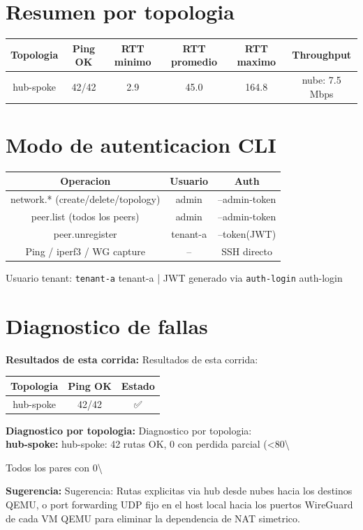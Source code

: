 \documentclass[11pt,a4paper]{article}
\begin{document}
\section{Resumen por topologia}
\begin{longtable}{|c|c|c|c|c|c|}
\hline
Topologia & Ping OK & RTT minimo & RTT promedio & RTT maximo & Throughput \\ \hline
hub-spoke & 42/42 & 2.9 & 45.0 & 164.8 & nube: 7.5 Mbps \\ \hline
\end{longtable}

\section{Modo de autenticacion CLI}
\begin{longtable}{|c|c|c|}
\hline
Operacion & Usuario & Auth \\ \hline
network.* (create/delete/topology) & admin & --admin-token \\ \hline
peer.list (todos los peers) & admin & --admin-token \\ \hline
peer.unregister & tenant-a & --token(JWT) \\ \hline
Ping / iperf3 / WG capture & -- & SSH directo \\ \hline
\end{longtable}

Usuario tenant:  \texttt{tenant-a} tenant-a  | JWT generado via  \texttt{auth-login} auth-login\\

\section{Diagnostico de fallas}
\textbf{Resultados de esta corrida:} Resultados de esta corrida:\\

\begin{longtable}{|c|c|c|}
\hline
Topologia & Ping OK & Estado \\ \hline
hub-spoke & 42/42 & ✅ \\ \hline
\end{longtable}

\textbf{Diagnostico por topologia:} Diagnostico por topologia:\\

\textbf{hub-spoke:} hub-spoke:  42 rutas OK, 0 con perdida parcial (<80\textbackslash{}%

Todos los pares con 0\textbackslash{}%

\textbf{Sugerencia:} Sugerencia:  Rutas explicitas via hub desde nubes hacia los destinos QEMU, o port forwarding UDP fijo en el host local hacia los puertos WireGuard de cada VM QEMU para eliminar la dependencia de NAT simetrico.\\
\end{document}
